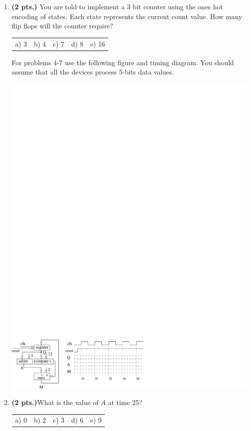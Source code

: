 \documentclass{article}
\begin{document}
\begin{enumerate}
\item {\bf (2 pts.)} You are told to implement a 3 bit counter using the
ones hot encoding of states.  Each state represents the current count value. 
How many flip flops will the counter require?

\begin{tabular}{p{0.75in}p{0.75in}p{0.75in}p{0.75in}p{0.75in}}
a) 3 & b) 4 & c) 7 & d) 8 & e) 16 \\
\end{tabular}

\pagebreak

For problems 4-7 use the following figure and timing diagram.
You should assume that all the devices process 5-bits data
values.

\includegraphics{./Fig3/BBBtiming1}

\item {\bf (2 pts.)}What is the value of $A$ at time 25?

\begin{tabular}{p{0.6in} p{0.6in} p{0.6in} p{0.6in} l}
a) 0  & b) 2  & c) 3  & d) 6  & e)  9
\end{tabular}


\end{enumerate}
\end{document}
